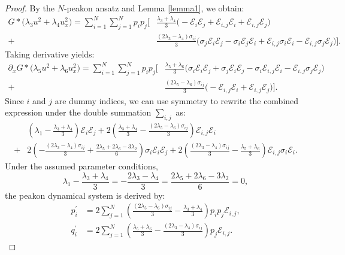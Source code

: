 \documentclass[11pt]{article}
\begin{document}
\begin{proof}
    By the $N$-peakon ansatz and Lemma \ref{lemma1}, we obtain:
    \begin{align*}
    G \ast \Big(\lambda_3 u^2 + \lambda_4 u_x^2 \Big) = \sum_{i=1}^N \sum_{j=1}^N p_i p_j \Bigg[ &\frac{\lambda_3 + \lambda_4}{3} \Big( -\mathcal{E}_i \mathcal{E}_j + \mathcal{E}_{i,j}\mathcal{E}_i + \mathcal{E}_{i,j}\mathcal{E}_j \Big) \\
    + &\frac{(2\lambda_3 - \lambda_4)\sigma_{ij}}{3} \Big( \sigma_j\mathcal{E}_i\mathcal{E}_j - \sigma_i\mathcal{E}_j\mathcal{E}_i + \mathcal{E}_{i,j}\sigma_i\mathcal{E}_i - \mathcal{E}_{i,j}\sigma_j\mathcal{E}_j \Big) \Bigg].
    \end{align*}
    Taking derivative yields:
    \begin{align*}
    \partial_x G \ast \Big(\lambda_5 u^2 + \lambda_6 u_x^2 \Big) = \sum_{i=1}^N \sum_{j=1}^N p_i p_j \Bigg[ &\frac{\lambda_5 + \lambda_6}{3} \Big( \sigma_i\mathcal{E}_i \mathcal{E}_j +\sigma_j\mathcal{E}_i \mathcal{E}_j -\sigma_i \mathcal{E}_{i,j}\mathcal{E}_i - \mathcal{E}_{i,j}\sigma_j\mathcal{E}_j \Big) \\
    + &\frac{(2\lambda_5 - \lambda_6)\sigma_{ij}}{3} \Big( -\mathcal{E}_{i,j} \mathcal{E}_i + \mathcal{E}_{i,j}\mathcal{E}_j \Big) \Bigg].
    \end{align*}
    Since $i$ and $j$ are dummy indices, we can use symmetry to rewrite the combined expression under the double summation $\sum_{i,j}$ as:
    \begin{align*}
        & \left( \lambda_1 - \frac{\lambda_3+ \lambda_4}{3}\right)\mathcal{E}_i \mathcal{E}_j + 2 \left(  \frac{\lambda_3 + \lambda_4}{3} - \frac{(2\lambda_5 - \lambda_6)\sigma_{ij}}{3}\right) \mathcal{E}_{i,j}\mathcal{E}_i \\
        + & 2 \left( - \frac{(2\lambda_3 - \lambda_4)\sigma_{ij}}{3} + \frac{2\lambda_5 + 2\lambda_6 - 3\lambda_2}{6}\right) \sigma_i\mathcal{E}_i\mathcal{E}_j + 2\left(  \frac{(2\lambda_3 - \lambda_4)\sigma_{ij}}{3} - \frac{\lambda_5 + \lambda_6}{3}\right) \mathcal{E}_{i,j}\sigma_i\mathcal{E}_i.
    \end{align*}
    Under the assumed parameter conditions,
    \begin{equation*}
    \lambda_1 - \frac{\lambda_3+ \lambda_4}{3} = - \frac{2\lambda_3 - \lambda_4}{3} = \frac{2\lambda_5 + 2\lambda_6 - 3\lambda_2}{6} = 0,
    \end{equation*}
    the peakon dynamical system is derived by:
    \begin{align*}
        p_i^\prime &= 2\sum_{j=1}^N \left(  \frac{(2\lambda_5 - \lambda_6)\sigma_{ij}}{3} - \frac{\lambda_3 + \lambda_4}{3}\right)p_i p_j \mathcal{E}_{i,j}, \\
        q_i^\prime &= 2\sum_{j=1}^N  \left( \frac{\lambda_5 + \lambda_6}{3}- \frac{(2\lambda_3 - \lambda_4)\sigma_{ij}}{3}\right) p_j\mathcal{E}_{i,j}.
    \end{align*}
\end{proof}
\end{document}
